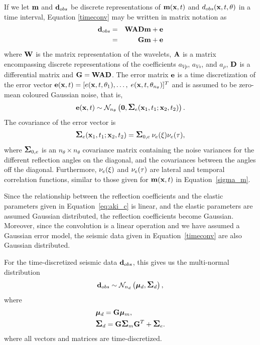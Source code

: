 If we let $\mathbf{m}$ and $\mathbf{d}_{obs}$ be discrete representations
of $\mathbf{m}(\mathbf{x},t)$ and $d_{obs}(\mathbf{x},t,\theta)$ in a time
interval, Equation \eqref{timeconv} may be written in matrix
notation as
%
\begin{eqnarray}
  \mathbf{d}_{obs} & = & \mathbf{W}\mathbf{A}\mathbf{D}\mathbf{m} + \mathbf{e} \label{eq:WADm}\\
  & = & \mathbf{G}\mathbf{m} + \mathbf{e} \label{eq:Gm}
\end{eqnarray}
%
\noindent
where $\mathbf{W}$ is the matrix representation of the wavelets, $\mathbf{A}$ is
a matrix encompassing discrete representations of the coefficients $a_{Vp}$,
$a_{V\!s}$, and $a_\rho$, $\mathbf{D}$ is a differential matrix and
$\mathbf{G} = \mathbf{W}\mathbf{A}\mathbf{D}$. The
error matrix $\mathbf{e}$ is a time discretization of the error vector
$\mathbf{e}(\mathbf{x},t) = [e(\mathbf{x},t,\theta_1),\ldots,$
$e(\mathbf{x},t,\theta_{n_{\theta}})]^T$ and is assumed to be zero-mean
coloured Gaussian noise, that is,
%
\begin{equation}
  \mathbf{e}(\mathbf{x},t)
    \sim \mathcal{N}_{n_\theta}\left(\mathbf{0},
               \mbox{\large\ensuremath{\boldsymbol{\Sigma}}}_e(\mathbf{x}_1,t_1;\mathbf{x}_2,t_2)\right).
\label{edist}
\end{equation}
%
The covariance of the error vector is
%
\begin{equation}
  \mbox{\large\ensuremath{\boldsymbol{\Sigma}}}_e(\mathbf{x}_1,t_1;\mathbf{x}_2,t_2)
    = \mbox{\large\ensuremath{\boldsymbol{\Sigma}}}_{0,e} \: \nu_e(\xi) \nu_e(\tau), \label{sigma_e}
\end{equation}
%
where $\mbox{\large\ensuremath{\boldsymbol{\Sigma}}}_{0,e}$ is an $n_{\theta}\times n_{\theta}$
covariance matrix containing the noise variances for the different
reflection angles on the diagonal, and the covariances between the
angles off the diagonal. Furthermore, $\nu_e(\xi)$ and $\nu_e(\tau)$
are lateral and temporal correlation functions, similar to those
given for $\mathbf{m}(\mathbf{x},t)$ in Equation~\eqref{sigma_m}.

Since the relationship between the reflection coefficients and the
elastic parameters given in Equation~\eqref{eq:aki_c} is linear, and
the elastic parameters are assumed Gaussian distributed, the
reflection coefficients become Gaussian. Moreover, since the
convolution is a linear operation and we have assumed a Gaussian error
model, the seismic data given in Equation~\eqref{timeconv} are also
Gaussian distributed.

For the time-discretized seismic data $\mathbf{d}_{obs}$, this gives us
the multi-normal distribution
%
\begin{equation}
  \mathbf{d}_{obs} \sim
    \mathcal{N}_{n_d}\left(\bm\mu_d,\mbox{\large\ensuremath{\boldsymbol{\Sigma}}}_d\right),
\label{ddist}
\end{equation}
%
where
%
\begin{align}
  &\bm\mu_d = \mathbf{G}\bm\mu_{m},\\
  &\mbox{\large\ensuremath{\boldsymbol{\Sigma}}}_d = \mathbf{G}\mbox{\large\ensuremath{\boldsymbol{\Sigma}}}_{m}\mathbf{G}^T + \mbox{\large\ensuremath{\boldsymbol{\Sigma}}}_e.
\end{align}
%
where all vectors and matrices are time-discretized.

